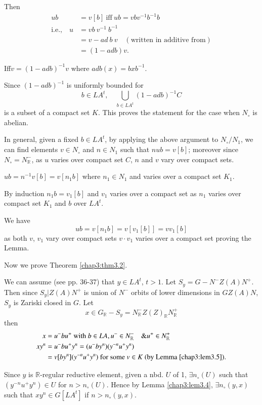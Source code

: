 Then 
\begin{align*}
  ub & = v[b] ~\text{iff}~ ub = vbv^{-1} b^{-1} b\\
  \text{i.e.,} \quad u & = vb~ v^{-1} ~b^{-1}\\
  & = v- ad ~b~v \quad (\text{written in additive from})\\
  & = (1- adb)v.
\end{align*}

Iff\pageoriginale $v= (1- adb)^{-1} v$ where $adb(x) = bxb^{-1}$.

Since $(1- adb)^{-1}$ is uniformly bounded for 
$$b \in LA^t,\quad {\bigcup_{b \in LA^t}(1- adb)^{-1}C}$$ 
is a subset of a
compact set $K$. This proves the statement for the case when $N_\circ$
is abelian. 

In general, given a fixed $b \in LA^t$, by applying the above argument
to $N_\circ/{N_1}$, we can find elements $v \in N_\circ$ and $n \in
N_1$ such that $nub = v[b]$; moreover since $N_\circ=
N^-_{\mathbb{R}}$, as $u$ varies over compact set $C$, $n$ and $v$
vary over compact sets.

$ub = n^{-1}v [b]= v[n_1 b]$ where $n_1 \in N_1$ and varies over a
compact set $K_1$.

By induction $n_1 b= v_1 [b]$ and $v_1$ varies over a compact set as
$n_1$ varies over compact set $K_1$ and $b$ over $LA^t$.

We have 
$$
ub =v [n_1b]= v [v_1 [b]]= v v_1 [b]
$$
as both $v$, $v_1$ vary over compact sets $v \cdot v_1$ varies over a
compact set proving the Lemma.

Now we prove Theorem \ref{chap3:thm3.2}. 

We can assume (see pp. 36-37) that $y \in LA^t$, $t > 1$. Let $S_y =G-
N^- Z(A)N^+$. Then since $S_y \Big| Z(A) N^+$ is union of $N^-$ orbits
of lower dimensions in $GZ(A)N$, $S_y$ is Zariski closed in $G$. Let
$$
x \in G_{\mathbb{R}}- S_y = N^-_{\mathbb{R}} Z(Z)_{\mathbb{R}} N^+_{\mathbb{R}}
$$
then\pageoriginale
\begin{align*}
  x & = u^- b u^+ ~\text{with}~ b \in LA, u^- \in N^-_{\mathbb{R}}
  \quad \& u^+ \in N^+_{\mathbb{R}}\\
  xy^n & = u^- b u^+ y^n = (u^- b y^n) (y^{-n} u^+ y^n)\\
  & = v[by^n](y^{-n} u^+ y^n) ~\text{for some $v \in K$ (by Lemma
    \ref{chap3:lem3.5})}.
\end{align*}

Since $y$ is $\mathbb{R}$-regular reductive element, given a nbd. $U$
of 1, $\exists n_\circ (U)$ such that $(y^{-n} u^+ y^n)\in U$ for $n >
n_\circ (U)$. Hence by Lemma \ref{chap3:lem3.4}, $\exists n_\circ (y,
x)$ such that $xy^n \in G [LA^t]$ if $n> n_\circ (y, x)$.

